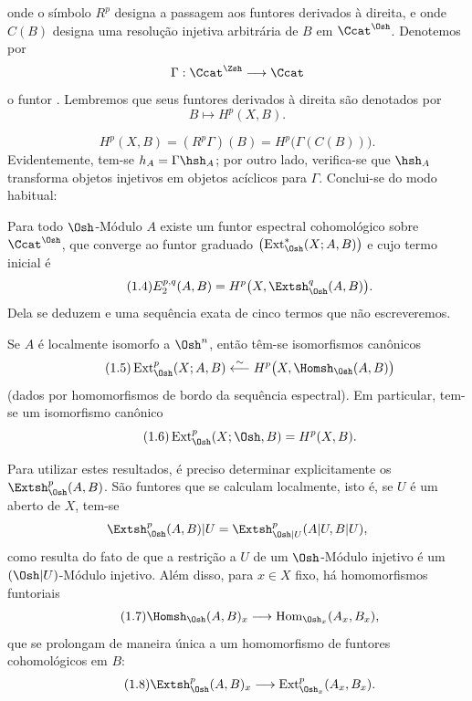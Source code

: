 onde o símbolo $R^{p}$ designa a passagem aos funtores derivados à direita, e onde
$C(B)$ designa uma resolução injetiva arbitrária de $B$ em $\Ccat^{\Osh}$.
Denotemos por
\[
  \Gamma:\Ccat^{\Zsh}\longrightarrow\Ccat
\]
o funtor . Lembremos que seus funtores derivados à direita são
denotados por
\[
  B\longmapsto H^{p}(X,B).
\]

\begin{equation}\tag{1.3}
  H^{p}(X,B)=(R^{p}\Gamma)(B)=H^{p}\bigl(\Gamma(C(B))\bigr).
\end{equation}
Evidentemente, tem-se $h_A=\Gamma\hsh_A$; por outro lado, verifica-se que $\hsh_A$
transforma objetos injetivos em objetos acíclicos para $\Gamma$. Conclui-se do
modo habitual:

 Para todo $\Osh$-Módulo $A$ existe um funtor
espectral cohomológico sobre $\Ccat^{\Osh}$, que converge ao funtor graduado
$\bigl(\operatorname{Ext}_{\Osh}^{*}(X;A,B)\bigr)$ e cujo termo inicial é
\begin{equation}\tag{1.4}
  E_{2}^{p,q}(A,B)=H^{p}\bigl(X,\Extsh_{\Osh}^{q}(A,B)\bigr).
\end{equation}
Dela se deduzem  e uma sequência exata de cinco termos
que não escreveremos.

 Se $A$ é localmente isomorfo a $\Osh^{n}$, então têm-se
isomorfismos canônicos
\begin{equation}\tag{1.5}
  \operatorname{Ext}_{\Osh}^{p}(X;A,B)
  \overset{\sim}{\longleftarrow}
  H^{p}\bigl(X,\Homsh_{\Osh}(A,B)\bigr)
\end{equation}
(dados por homomorfismos de bordo da sequência espectral). Em particular, tem-se
um isomorfismo canônico
\begin{equation}\tag{1.6}
  \operatorname{Ext}_{\Osh}^{p}(X;\Osh,B)=H^{p}(X,B).
\end{equation}

Para utilizar estes resultados, é preciso determinar explicitamente os
$\Extsh_{\Osh}^{p}(A,B)$. São funtores que se calculam localmente,
isto é, se $U$ é um aberto de $X$, tem-se
\[
  \Extsh_{\Osh}^{p}(A,B)|U
  =\Extsh_{\Osh|U}^{p}(A|U,B|U),
\]
como resulta do fato de que a restrição a $U$ de um $\Osh$-Módulo injetivo
é um $(\Osh|U)$-Módulo injetivo. Além disso, para $x\in X$ fixo, há homomorfismos funtoriais
\begin{equation}\tag{1.7}
  \Homsh_{\Osh}(A,B)_x
  \longrightarrow
  \operatorname{Hom}_{\Osh_x}(A_x,B_x),
\end{equation}
que se prolongam de maneira única a um homomorfismo de funtores cohomológicos
em $B$:
\begin{equation}\tag{1.8}
  \Extsh_{\Osh}^{p}(A,B)_x
  \longrightarrow
  \operatorname{Ext}_{\Osh_x}^{p}(A_x,B_x).
\end{equation}

